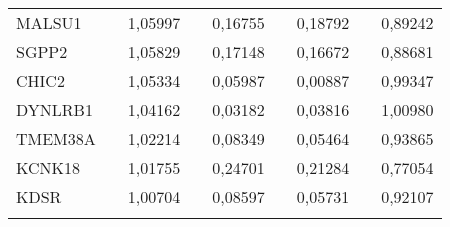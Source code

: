\begin{center}
\begin{longtable}{lrrrrrrrr}
MALSU1         & & 1,05997   & & 0,16755    & & 0,18792   & & 0,89242   \\
SGPP2          & & 1,05829   & & 0,17148    & & 0,16672   & & 0,88681   \\
CHIC2          & & 1,05334   & & 0,05987    & & 0,00887   & & 0,99347   \\
DYNLRB1        & & 1,04162   & & 0,03182    & & 0,03816   & & 1,00980   \\
TMEM38A        & & 1,02214   & & 0,08349    & & 0,05464   & & 0,93865   \\
KCNK18         & & 1,01755   & & 0,24701    & & 0,21284   & & 0,77054   \\
KDSR           & & 1,00704   & & 0,08597    & & 0,05731   & & 0,92107   \\
\label{app_t_positive_selection}
\end{longtable}
\end{center}
